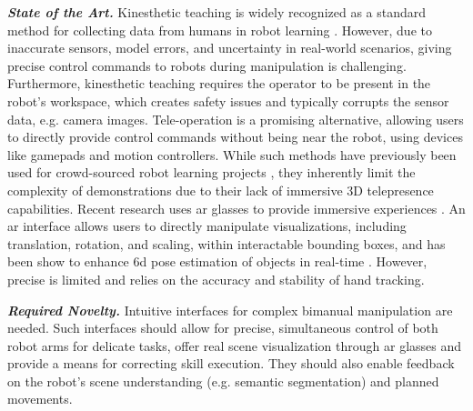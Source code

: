 \documentclass{erc-B2}
\begin{document}
\textit{\textbf{State of the Art.}} 
Kinesthetic teaching is widely recognized as a standard method for collecting data from humans in robot learning \cite{Wrede_Emmerich_Grünberg_Nordmann_Swadzba_Steil_2013, Ravichandar_Polydoros_Chernova_Billard_2020, Sukkar_Moreno_Vidal_Calleja_Deuse_2023}. However, due to inaccurate sensors, model errors, and uncertainty in real-world scenarios, giving precise control commands to robots during manipulation is challenging. 
Furthermore, kinesthetic teaching requires the operator to be present in the robot's workspace, which creates safety issues and typically corrupts the sensor data, e.g. camera images. 
Tele-operation is a promising alternative, allowing users to directly provide control commands without being near the robot, using devices like gamepads and motion controllers.
While such methods have previously been used for crowd-sourced robot learning projects \cite{mandlekar2018roboturk}, they inherently limit the complexity of demonstrations due to their lack of immersive 3D telepresence capabilities. 
Recent research uses \gls*{ar} glasses to provide immersive experiences \cite{Mullen_Mosier_Chakrabarti_Chen_White_Losey_2021, Rosen_Whitney_Phillips_Chien_Tompkin_Konidaris_Tellex_2020}. An \gls*{ar} interface allows users to directly manipulate visualizations, including translation, rotation, and scaling, within interactable bounding boxes, and has been show to enhance \gls*{6d} pose estimation of objects in real-time \cite{sahin2020review, firintepe2021ir}. However, precise is limited and relies on the accuracy and stability of hand tracking. 


\textit{\textbf{Required Novelty.}} Intuitive interfaces for complex bimanual manipulation are needed. Such interfaces should allow for precise, simultaneous control of both robot arms for delicate tasks, offer real scene visualization through \gls*{ar} glasses and provide a means for correcting skill execution. They should also enable feedback on the robot's scene understanding (e.g. semantic segmentation) and planned movements.
\end{document}
